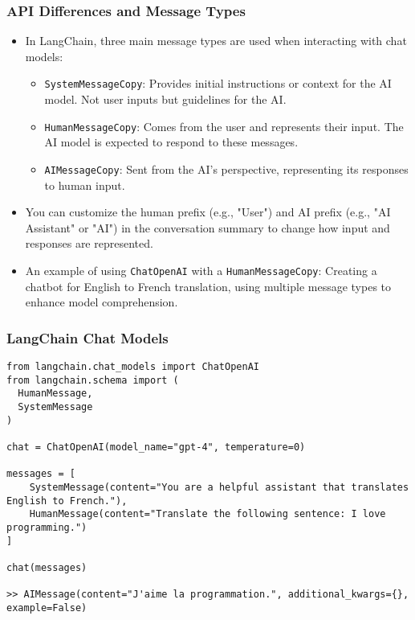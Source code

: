 \begin{frame}[fragile]
\frametitle{API Differences and Message Types}

\begin{itemize}
    \item In LangChain, three main message types are used when interacting with chat models:
    \begin{itemize}
        \item \texttt{SystemMessageCopy}: Provides initial instructions or context for the AI model. Not user inputs but guidelines for the AI.
        \item \texttt{HumanMessageCopy}: Comes from the user and represents their input. The AI model is expected to respond to these messages.
        \item \texttt{AIMessageCopy}: Sent from the AI's perspective, representing its responses to human input.
    \end{itemize}
    \item You can customize the human prefix (e.g., "User") and AI prefix (e.g., "AI Assistant" or "AI") in the conversation summary to change how input and responses are represented.
    \item An example of using \texttt{ChatOpenAI} with a \texttt{HumanMessageCopy}: Creating a chatbot for English to French translation, using multiple message types to enhance model comprehension.
\end{itemize}

\end{frame}

\begin{frame}[fragile]\frametitle{LangChain Chat Models}

\begin{lstlisting}
from langchain.chat_models import ChatOpenAI
from langchain.schema import (
  HumanMessage,
  SystemMessage
)

chat = ChatOpenAI(model_name="gpt-4", temperature=0)

messages = [
	SystemMessage(content="You are a helpful assistant that translates English to French."),
	HumanMessage(content="Translate the following sentence: I love programming.")
]

chat(messages)

>> AIMessage(content="J'aime la programmation.", additional_kwargs={}, example=False)
\end{lstlisting}	  

\end{frame}


